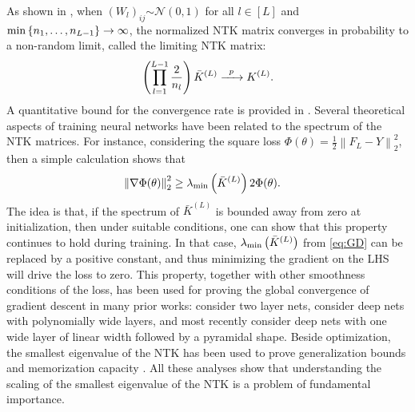 \documentclass[11pt]{article}
\def\Set#1{\left\{ #1 \right\}}
\newcommand{\distas}[1]{\mathbin{\overset{#1}{\sim}}}
\newcommand{\norm}[1]{\left\|#1\right\|}
\newcommand{\evmin}[1]{\lambda_{\rm min}\left(#1\right)}
\def\min{\mathop{\rm min}\nolimits}
\begin{document}
As shown in \citep{JacotEtc2018},
when $(W_l)_{ij}\distas{}\mathcal{N}(0,1)$ for all $l\in[L]$ and $\min\Set{n_1,\ldots,n_{L-1}}\to\infty$,
the normalized NTK matrix converges in probability to a non-random limit, called the limiting NTK matrix:
\begin{align}\label{eq:plim}
    \left(\prod_{l=1}^{L-1}\frac{2}{n_l}\right) \bar{K}^{(L)} \xrightarrow{\enskip p \enskip} K^{(L)} .
\end{align}
A quantitative bound for the convergence rate is provided in \citep{AroraEtal2019}.
Several theoretical aspects of training neural networks have been related to the spectrum of the NTK matrices.
For instance, considering the square loss $\Phi(\theta)=\frac{1}{2}\norm{F_L-Y}_2^2$, then a simple calculation shows that
\begin{align}\label{eq:GD}
    \norm{\nabla\Phi(\theta)}_2^2
    &\geq \evmin{\bar{K}^{(L)}} 2\Phi(\theta) .
\end{align}
The idea is that, if the spectrum of $\bar{K}^{(L)}$ is bounded away from zero at initialization,
then under suitable conditions, one can show that this property continues to hold during training.
In that case, $\evmin{\bar{K}^{(L)}}$ from \eqref{eq:GD} can be replaced by a positive constant, 
and thus minimizing the gradient on the LHS will drive the loss to zero.
This property, together with other smoothness conditions of the loss,
has been used for proving the global convergence of gradient descent in many prior works:
\citep{DuEtal2018_ICLR, OymakMahdi2019, SongYang2020,wu2019global} consider two layer nets, 
\citep{AllenZhuEtal2018,DuEtal2019,zou2020gradient,ZouGu2019} consider deep nets with polynomially wide layers,
and most recently \citep{QuynhMarco2020} consider deep nets with one wide layer of linear width followed by a pyramidal shape.
Beside optimization, the smallest eigenvalue of the NTK has been used to prove generalization bounds \citep{arora2019fine,Andrea2020}
and memorization capacity \citep{Andrea2020}.
All these analyses show that understanding the scaling of the smallest eigenvalue of the NTK is a problem of fundamental importance.
\end{document}
